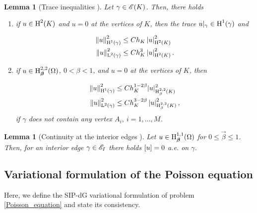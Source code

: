 \documentclass[a4paper,11pt]{article}
\newtheorem{lemma}[theorem]{Lemma}
\begin{document}
\begin{lemma}[Trace inequalities {\cite[Lemma A.2.4]{Wihler:2003}}]
\label{lemma:trace_inequality}
Let $\gamma \in \mathscr E(K)$. Then, there holds

\begin{enumerate}
    \item if $u \in \operatorname H^{2}(K)$ and $u = 0$ at the vertices of $K$, then the trace $u|_{\gamma} \in \operatorname H^{1}(\gamma)$ and
    
    \begin{equation}
    \begin{split}
    \left\|u\right\|^{2}_{\operatorname H^{1}(\gamma)} &\leq Ch_{K}\left|u\right|^{2}_{\operatorname H^{2}(K)}\\
    \left\|u\right\|^{2}_{\operatorname L^{2}(\gamma)} &\leq  C h_{K}^{3}\left|u\right|^{2}_{\operatorname H^{2}(K)}.
    \end{split}
    \end{equation}

    \item  if $u \in \operatorname H^{2,2}_{\boldsymbol \beta}(\Omega)$, $0 < \beta < 1$, and $u = 0$ at the vertices of $K$, then 

    \begin{equation}
    \begin{split}
    \left\|u\right\|^{2}_{\operatorname H^{1}(\gamma)} &\leq Ch_{K}^{1-2\beta}|u|^{2}_{\operatorname H^{2,2}_{\beta}(K)}\\
     \left\|u\right\|^{2}_{\operatorname L^{2}(\gamma)} &\leq  C h_{K}^{3-2\beta}\left|u\right|^{2}_{\operatorname H^{2,2}_{\beta}(K)},
    \end{split}
    \end{equation}
if $\gamma$ does not contain any vertex $A_{i}, \ i = 1, \dots,M$.
\end{enumerate}

\end{lemma}

\begin{lemma}[Continuity at the interior edges {\cite[Lemma 1.3.4]{Wihler:2003}}]\label{lemma:null_jump}
Let $u \in \operatorname H^{1,1}_{\boldsymbol \beta}(\Omega)$ for $0 \leq \vec{\beta} \leq 1$. Then, for an interior edge $\gamma \in \mathscr E_{I}$ there holds $\left[ u\right] = 0$ a.e. on $\gamma$.  
\end{lemma}

\subsection{Variational formulation of the Poisson equation}

Here, we define the SIP-dG variational formulation of problem \eqref{Poisson_equation} and state its consistency.
\end{document}

